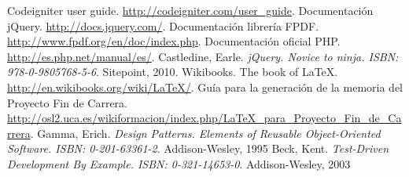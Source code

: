 \documentclass[a4paper,11pt]{article} %
\begin{document}

\begin{thebibliography}{99}
Codeigniter user guide. \url{http://codeigniter.com/user_guide}.
 Documentación jQuery. \url{http://docs.jquery.com/}.
 Documentación librería FPDF. \url{http://www.fpdf.org/en/doc/index.php}.
 Documentación oficial PHP. \url{http://es.php.net/manual/es/}.
 Castledine, Earle. \emph{jQuery. Novice to ninja. ISBN: 978-0-9805768-5-6}. Sitepoint, 2010.
 Wikibooks. The book of \LaTeX. \url{http://en.wikibooks.org/wiki/LaTeX/}.
Guía para la generación de la memoria del Proyecto Fin de Carrera.\\ \url{http://osl2.uca.es/wikiformacion/index.php/LaTeX_para_Proyecto_Fin_de_Carrera}.
 Gamma, Erich. \emph{Design Patterns. Elements of Reusable Object-Oriented Software. ISBN: 0-201-63361-2}. Addison-Wesley, 1995
 Beck, Kent. \emph{Test-Driven Development By Example. ISBN: 0-321-14653-0}. Addison-Wesley, 2003
\end{thebibliography}
\end{document}
